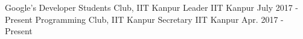 

\begin{cventries}

  \extraentry
  {Google's Developer Students Club, IIT Kanpur}
  {Leader}
  {IIT Kanpur}
  {July 2017 - Present}
  {
  }
  \vspace{-0.3cm}
  \extraentry
  {Programming Club, IIT Kanpur}
  {Secretary}
  {IIT Kanpur}
  {Apr. 2017 - Present}
  {
  }
  \vspace{-0.3cm}

\end{cventries}
